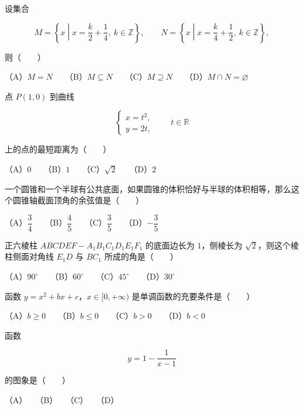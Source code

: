 \begin{question}
设集合

\nopagebreak[4]
\[
M=\left\{x\middle|x=\frac{k}{2}+\frac14,\ k\in\mathbb Z\right\},\qquad
N=\left\{x\middle|x=\frac{k}{4}+\frac12,\ k\in\mathbb Z\right\},
\]

则\mbox{（　　）}

（A）$M=N$　　（B）$M\subseteq N$　　（C）$M\supseteq N$　　（D）$M\cap N=\varnothing$

\end{question}
\begin{question}
点 $P(1,0)$ 到曲线

\nopagebreak[4]
\[
\begin{cases}
x=t^2,\\
y=2t,
\end{cases}
\qquad t\in\mathbb R
\]

上的点的最短距离为\mbox{（　　）}

（A）$0$　　（B）$1$　　（C）$\sqrt2$　　（D）$2$

\end{question}
\begin{question}
一个圆锥和一个半球有公共底面，如果圆锥的体积恰好与半球的体积相等，那么这个圆锥轴截面顶角的余弦值是\mbox{（　　）}

（A）$\dfrac34$　　（B）$\dfrac45$　　（C）$\dfrac35$　　（D）$-\dfrac35$

\end{question}
\begin{question}
正六棱柱 $ABCDEF-A_1B_1C_1D_1E_1F_1$ 的底面边长为 $1$，侧棱长为 $\sqrt2$，则这个棱柱侧面对角线 $E_1D$ 与 $BC_1$ 所成的角是\mbox{（　　）}

（A）$90^\circ$　　（B）$60^\circ$　　（C）$45^\circ$　　（D）$30^\circ$

\end{question}
\begin{question}
函数 $y=x^2+bx+c$，$x\in[0,+\infty)$ 是单调函数的充要条件是\mbox{（　　）}

（A）$b\geqslant0$　　（B）$b\leqslant0$　　（C）$b>0$　　（D）$b<0$

\Needspace{0.4\textheight}
\end{question}
\begin{question}
函数

\nopagebreak[4]
\[
y=1-\frac{1}{x-1}
\]

的图象是\mbox{（　　）}
\nopagebreak[4]
\begin{center}\end{center}
\nopagebreak[4]
（A）　　（B）　　（C）　　（D）

\end{question}
